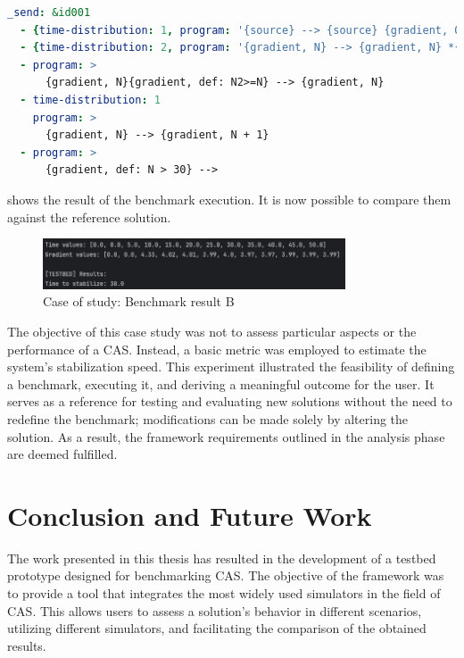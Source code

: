 \documentclass[12pt,a4paper,openright,twoside]{book}
\begin{document}
\begin{lstlisting}[language=yaml, caption={Case of study: benchmark configuration file}]
  _send: &id001
  - {time-distribution: 1, program: '{source} --> {source} {gradient, 0}'}
  - {time-distribution: 2, program: '{gradient, N} --> {gradient, N} *{gradient, N+#D}'}
  - program: >
      {gradient, N}{gradient, def: N2>=N} --> {gradient, N}
  - time-distribution: 1
    program: >
      {gradient, N} --> {gradient, N + 1}
  - program: >
      {gradient, def: N > 30} -->
\end{lstlisting}

 shows the result of the benchmark execution.
It is now possible to compare them against the reference solution.

\begin{figure}[H]
  \centering
  \includegraphics[width=0.8\textwidth]{figures/result-B.png}
  \caption{Case of study: Benchmark result B}
  \label{fig:result-B}
\end{figure}

The objective of this case study was not to assess particular aspects or the performance of a CAS. 
Instead, a basic metric was employed to estimate the system's stabilization speed.
This experiment illustrated the feasibility of defining a benchmark, executing it, and deriving a meaningful outcome for the user. 
It serves as a reference for testing and evaluating new solutions without the need to redefine the benchmark; modifications can be made solely by altering the solution. 
As a result, the framework requirements outlined in the analysis phase are deemed fulfilled.

\chapter{Conclusion and Future Work}

The work presented in this thesis has resulted in the development of a testbed prototype designed for benchmarking \ac*{CAS}.
The objective of the framework was to provide a tool that integrates the most widely used simulators in the field of \ac*{CAS}.
This allows users to assess a solution's behavior in different scenarios, utilizing different simulators, and facilitating the comparison of the obtained results.
\end{document}
